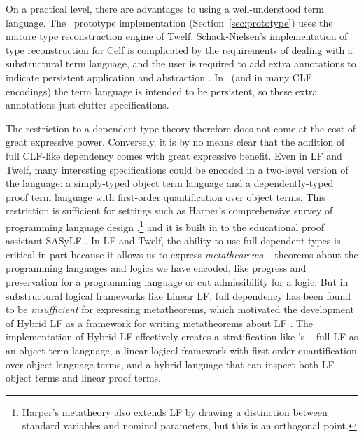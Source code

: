 On a practical level, there are advantages to using a well-understood
term language. The \sls~prototype implementation
(Section~\ref{sec:prototype}) uses the mature type reconstruction
engine of Twelf. Schack-Nielsen's implementation of type
reconstruction for Celf is complicated by the requirements of dealing
with a substructural term language, and the user is required to add
extra annotations to indicate persistent application and abstraction
\cite{schacknielsen08celf}. In \sls~(and in many CLF encodings) the
term language is intended to be persistent, so these extra annotations
just clutter specifications.

The restriction to a dependent type theory therefore does not come at
the cost of great expressive power. Conversely, it is by no means
clear that the addition of full CLF-like dependency comes with great
expressive benefit. Even in LF and Twelf, many interesting
specifications could be encoded in a two-level version of the
language: a simply-typed object term language and a dependently-typed
proof term language with first-order quantification over object
terms. This restriction is sufficient for settings such as Harper's
comprehensive survey of programming language design
\cite{harper12practical},\footnote{Harper's metatheory also extends LF
  by drawing a distinction between standard variables and nominal
  parameters, but this is an orthogonal point.} and it is built in to
the educational proof assistant SASyLF \cite{aldrich08sasylf}. In LF
and Twelf, the ability to use full dependent types is critical in part
because it allows us to express {\it metatheorems} -- theorems about
the programming languages and logics we have encoded, like progress
and preservation for a programming language or cut admissibility for a
logic. But in substructural logical frameworks like Linear LF, full
dependency has been found to be {\it insufficient} for expressing
metatheorems, which motivated the development of Hybrid LF as a
framework for writing metatheorems about LF \cite{reed09hybrid}. The
implementation of Hybrid LF effectively creates a stratification like
\sls's -- full LF as an object term language, a linear logical
framework with first-order quantification over object language terms,
and a hybrid language that can inspect both LF object terms and linear
proof terms. 

